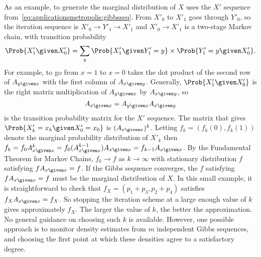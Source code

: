 \documentclass[12pt]{article}
\begin{document}
As an example, to generate the marginal distribution of \( X \) uses the
\( X' \) sequence from~\eqref{eq:applicationsmetropolis:gibbsseq}. From \(
X'_0 \) to \( X'_1 \) goes through \( Y'_0 \), so the iteration sequence
is \( X'_0 \to Y'_1 \to X'_1 \) and \( X'_0 \to X'_1 \) is a two-stage
Markov chain, with transition probability
\[
    \Prob{X'_1 \given X'_0} = \sum\limits_y \Prob{X'_1 \given Y'_1 = y}
    \times \Prob{Y'_1 = y \given X'_0}.
\] For example, to go from \( x = 1 \) to \( x = 0 \) takes the dot
product of the second row of \( A_{y \given x} \) with the first column
of \( A_{x \given y} \).  Generally, \( \Prob{X'_1 \given X'_0} \) is
the right matrix multiplication of \( A_{y \given x} \) by \( A_{x
\given y} \), so
\[
    A_{x \given x} = A_{ y \given x } A_{x \given y}
\] is the transition probability matrix for the \( X' \) sequence.  The
matrix that gives \( \Prob{X'_k = x_k \given X'_0 = x_0} \) is \( (A_{x
\given x})^k \).  Letting \( f_k = (f_k(0), f_k(1)) \) denote the
marginal probability distribution of \( X'_k \) then \( f_k = f_0 A^k_{x
\given x} = f_0 (A^{k-1}_{x \given x}) A_{x \given x} = f_{k-1} A_{x
\given x} \).  By the Fundamental Theorem for Markov Chains, \( f_k \to
f \) as \( k \to \infty \) with stationary distribution \( f \)
satisfying \( f A_{x \given x} = f \).  If the Gibbs sequence converges,
the \( f \) satisfying \( f A_{x \given x} = f \) must be the marginal
distribution of \( X \).  In this small example, it is straightforward
to check that \( f_X = ( p_1 + p_3, p_2 + p_4) \) satisfies \( f_X A_{x
\given x} = f_X \). So stopping the iteration scheme at a large enough
value of \( k \) gives approximately \( f_X \).  The larger the value of
\( k \), the better the approximation.  No general guidance on choosing
such \( k \) is available.  However, one possible approach is to monitor
density estimates from \( m \) independent Gibbs sequences, and choosing
the first point at which these densities agree to a satisfactory degree.
\end{document}
